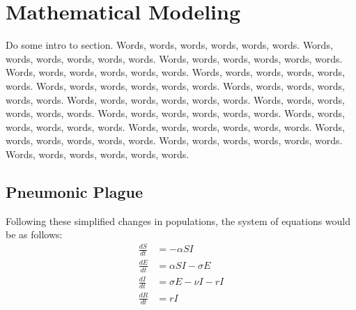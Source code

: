 \documentclass [letterpaper, 12pt] {article}
\begin{document}
\pagebreak

\section {Mathematical Modeling}

Do some intro to section.  
Words, words, words, words, words, words.  Words, words, words, words, words, words. Words, words, words, words, words, words. Words, words, words, words, words, words. Words, words, words, words, words, words. Words, words, words, words, words, words. Words, words, words, words, words, words. Words, words, words, words, words, words. Words, words, words, words, words, words. Words, words, words, words, words, words. Words, words, words, words, words, words. Words, words, words, words, words, words. Words, words, words, words, words, words. Words, words, words, words, words, words. Words, words, words, words, words, words. 


\subsection {Pneumonic Plague}

Following these simplified changes in
populations, the system of equations would be as follows:
\begin{align} 
	\frac{dS}{dt}  &=  -\alpha SI \\ 
	\frac{dE}{dt}  &=  \alpha SI - \sigma E \\
	\frac{dI}{dt}  &=  \sigma E - \nu I - rI \\
	\frac{dR}{dt} &= rI
\end{align}
\end{document}
